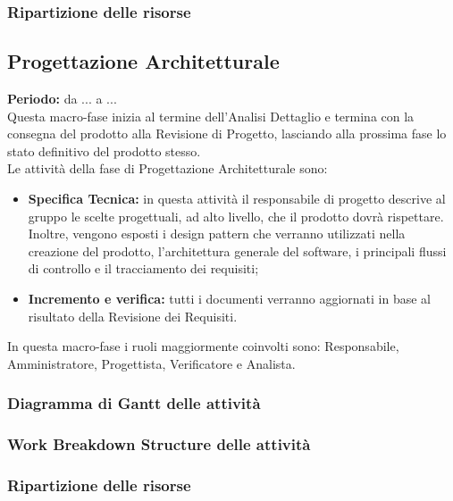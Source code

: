 \subsubsection{Ripartizione delle risorse}
\subsection{Progettazione Architetturale}
	\textbf{Periodo:} da ... a ... \\
	Questa macro-fase inizia al termine dell'Analisi Dettaglio e termina con la consegna del prodotto alla Revisione di Progetto, lasciando alla prossima fase lo stato definitivo del prodotto stesso. \\
	Le attività della fase di Progettazione Architetturale sono: \\
	\begin{itemize}
		\item \textbf{Specifica Tecnica:} in questa attività il responsabile di progetto descrive al gruppo le scelte progettuali, ad alto livello, che il prodotto dovrà rispettare. Inoltre, vengono esposti i design pattern che verranno utilizzati nella creazione del prodotto, l'architettura generale del software, i principali flussi di controllo e il tracciamento dei requisiti; \\
		\item \textbf{Incremento e verifica:} tutti i documenti verranno aggiornati in base al risultato
della Revisione dei Requisiti. \\
	\end{itemize}
	In questa macro-fase i ruoli maggiormente coinvolti sono: Responsabile, Amministratore, Progettista, Verificatore e Analista.
\subsubsection{Diagramma di Gantt delle attività}
\subsubsection{Work Breakdown Structure delle attività}
\subsubsection{Ripartizione delle risorse}
